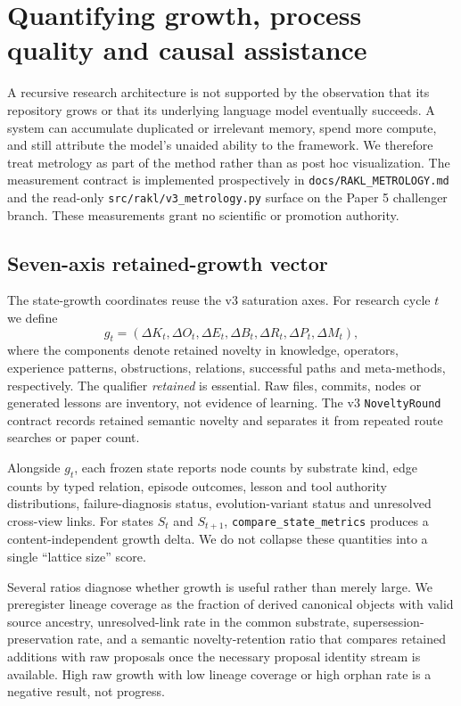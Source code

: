 \section{Quantifying growth, process quality and causal assistance}
\label{sec:metrology}

A recursive research architecture is not supported by the observation that its repository grows or that its underlying language model eventually succeeds. A system can accumulate duplicated or irrelevant memory, spend more compute, and still attribute the model's unaided ability to the framework. We therefore treat metrology as part of the method rather than as post hoc visualization. The measurement contract is implemented prospectively in \texttt{docs/RAKL\_METROLOGY.md} and the read-only \texttt{src/rakl/v3\_metrology.py} surface on the Paper 5 challenger branch. These measurements grant no scientific or promotion authority.

\subsection{Seven-axis retained-growth vector}

The state-growth coordinates reuse the v3 saturation axes. For research cycle $t$ we define
\[
 g_t=(\Delta K_t,\Delta O_t,\Delta E_t,\Delta B_t,\Delta R_t,\Delta P_t,\Delta M_t),
\]
where the components denote retained novelty in knowledge, operators, experience patterns, obstructions, relations, successful paths and meta-methods, respectively. The qualifier \emph{retained} is essential. Raw files, commits, nodes or generated lessons are inventory, not evidence of learning. The v3 \texttt{NoveltyRound} contract records retained semantic novelty and separates it from repeated route searches or paper count.

Alongside $g_t$, each frozen state reports node counts by substrate kind, edge counts by typed relation, episode outcomes, lesson and tool authority distributions, failure-diagnosis status, evolution-variant status and unresolved cross-view links. For states $S_t$ and $S_{t+1}$, \texttt{compare\_state\_metrics} produces a content-independent growth delta. We do not collapse these quantities into a single ``lattice size'' score.

Several ratios diagnose whether growth is useful rather than merely large. We preregister lineage coverage as the fraction of derived canonical objects with valid source ancestry, unresolved-link rate in the common substrate, supersession-preservation rate, and a semantic novelty-retention ratio that compares retained additions with raw proposals once the necessary proposal identity stream is available. High raw growth with low lineage coverage or high orphan rate is a negative result, not progress.

